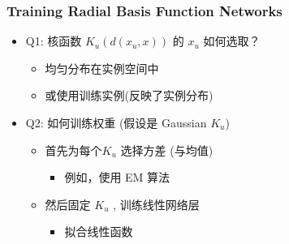 \documentclass{beamer}
\begin{document}
\begin{frame}
\frametitle{Training Radial Basis Function Networks}
\label{sec-4-3}


\begin{itemize}
\item Q1: 核函数 $K_u(d(x_u,x))$ 的 $x_u$ 如何选取？
\begin{itemize}
\item 均匀分布在实例空间中
\item 或使用训练实例(反映了实例分布)
\end{itemize}
\item Q2: 如何训练权重 (假设是 Gaussian $K_u$)
\begin{itemize}
\item 首先为每个$K_u$ 选择方差 (与均值)
\begin{itemize}
\item 例如，使用 EM 算法
\end{itemize}
\item 然后固定  $K_u$ , 训练线性网络层
\begin{itemize}
\item 拟合线性函数
\end{itemize}
\end{itemize}
\end{itemize}
\end{frame}
\end{document}
